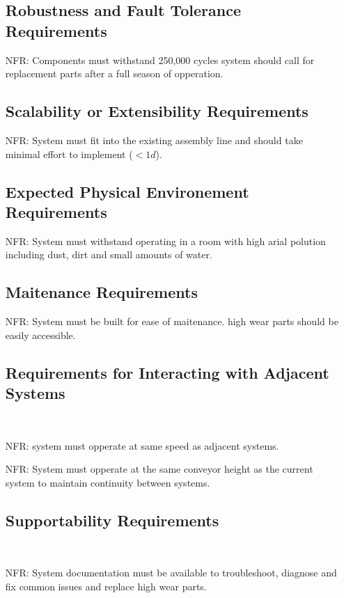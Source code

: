 \documentclass[12pt]{article}
\newcounter{nfrnum} %
\begin{document}
\begin{itemize}
\subsection{Robustness and Fault Tolerance Requirements}
\item[NFR\refstepcounter{nfrnum}\thenfrnum \label{NFR_Portability}:]
Components must withstand 250,000 cycles system should call for replacement parts after a full season of opperation.

\subsection{Scalability or Extensibility Requirements}
\item[NFR\refstepcounter{nfrnum}\thenfrnum \label{NFR_Portability}:]
System must fit into the existing assembly line and should take minimal effort to implement ($<1d$).

\subsection{Expected Physical Environement Requirements}
\item[NFR\refstepcounter{nfrnum}\thenfrnum \label{NFR_Portability}:]
System must withstand operating in a room with high arial polution including dust, dirt and small amounts of water.

\subsection{Maitenance Requirements}
\item[NFR\refstepcounter{nfrnum}\thenfrnum \label{NFR_Portability}:]
System must be built for ease of maitenance. high wear parts should be easily accessible.

\subsection{Requirements for Interacting with Adjacent Systems }\
\item[NFR\refstepcounter{nfrnum}\thenfrnum \label{NFR_Portability}:]
system must opperate at same speed as adjacent systems.

\item[NFR\refstepcounter{nfrnum}\thenfrnum \label{NFR_Portability}:]
System must opperate at the same conveyor height as the current system to maintain continuity between systems.

\subsection{Supportability Requirements }\
\item[NFR\refstepcounter{nfrnum}\thenfrnum \label{NFR_Portability}:]
System documentation must be available to troubleshoot, diagnose and fix common issues and replace high wear parts.


\end{itemize}
\end{document}
